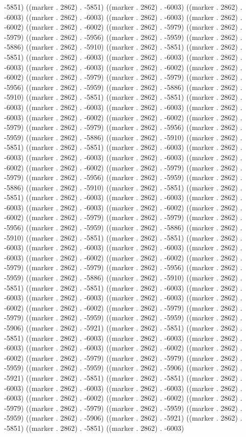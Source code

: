 -5851) ((marker . 2862) . -5851) ((marker . 2862) . -6003) ((marker . 2862) . -6003) ((marker . 2862) . -6003) ((marker . 2862) . -6003) ((marker . 2862) . -6002) ((marker . 2862) . -6002) ((marker . 2862) . -5979) ((marker . 2862) . -5979) ((marker . 2862) . -5956) ((marker . 2862) . -5959) ((marker . 2862) . -5886) ((marker . 2862) . -5910) ((marker . 2862) . -5851) ((marker . 2862) . -5851) ((marker . 2862) . -6003) ((marker . 2862) . -6003) ((marker . 2862) . -6003) ((marker . 2862) . -6003) ((marker . 2862) . -6002) ((marker . 2862) . -6002) ((marker . 2862) . -5979) ((marker . 2862) . -5979) ((marker . 2862) . -5956) ((marker . 2862) . -5959) ((marker . 2862) . -5886) ((marker . 2862) . -5910) ((marker . 2862) . -5851) ((marker . 2862) . -5851) ((marker . 2862) . -6003) ((marker . 2862) . -6003) ((marker . 2862) . -6003) ((marker . 2862) . -6003) ((marker . 2862) . -6002) ((marker . 2862) . -6002) ((marker . 2862) . -5979) ((marker . 2862) . -5979) ((marker . 2862) . -5956) ((marker . 2862) . -5959) ((marker . 2862) . -5886) ((marker . 2862) . -5910) ((marker . 2862) . -5851) ((marker . 2862) . -5851) ((marker . 2862) . -6003) ((marker . 2862) . -6003) ((marker . 2862) . -6003) ((marker . 2862) . -6003) ((marker . 2862) . -6002) ((marker . 2862) . -6002) ((marker . 2862) . -5979) ((marker . 2862) . -5979) ((marker . 2862) . -5956) ((marker . 2862) . -5959) ((marker . 2862) . -5886) ((marker . 2862) . -5910) ((marker . 2862) . -5851) ((marker . 2862) . -5851) ((marker . 2862) . -6003) ((marker . 2862) . -6003) ((marker . 2862) . -6003) ((marker . 2862) . -6003) ((marker . 2862) . -6002) ((marker . 2862) . -6002) ((marker . 2862) . -5979) ((marker . 2862) . -5979) ((marker . 2862) . -5956) ((marker . 2862) . -5959) ((marker . 2862) . -5886) ((marker . 2862) . -5910) ((marker . 2862) . -5851) ((marker . 2862) . -5851) ((marker . 2862) . -6003) ((marker . 2862) . -6003) ((marker . 2862) . -6003) ((marker . 2862) . -6003) ((marker . 2862) . -6002) ((marker . 2862) . -6002) ((marker . 2862) . -5979) ((marker . 2862) . -5979) ((marker . 2862) . -5956) ((marker . 2862) . -5959) ((marker . 2862) . -5886) ((marker . 2862) . -5910) ((marker . 2862) . -5851) ((marker . 2862) . -5851) ((marker . 2862) . -6003) ((marker . 2862) . -6003) ((marker . 2862) . -6003) ((marker . 2862) . -6003) ((marker . 2862) . -6002) ((marker . 2862) . -6002) ((marker . 2862) . -5979) ((marker . 2862) . -5979) ((marker . 2862) . -5959) ((marker . 2862) . -5959) ((marker . 2862) . -5906) ((marker . 2862) . -5921) ((marker . 2862) . -5851) ((marker . 2862) . -5851) ((marker . 2862) . -6003) ((marker . 2862) . -6003) ((marker . 2862) . -6003) ((marker . 2862) . -6003) ((marker . 2862) . -6002) ((marker . 2862) . -6002) ((marker . 2862) . -5979) ((marker . 2862) . -5979) ((marker . 2862) . -5959) ((marker . 2862) . -5959) ((marker . 2862) . -5906) ((marker . 2862) . -5921) ((marker . 2862) . -5851) ((marker . 2862) . -5851) ((marker . 2862) . -6003) ((marker . 2862) . -6003) ((marker . 2862) . -6003) ((marker . 2862) . -6003) ((marker . 2862) . -6002) ((marker . 2862) . -6002) ((marker . 2862) . -5979) ((marker . 2862) . -5979) ((marker . 2862) . -5959) ((marker . 2862) . -5959) ((marker . 2862) . -5906) ((marker . 2862) . -5921) ((marker . 2862) . -5851) ((marker . 2862) . -5851) ((marker . 2862) . -6003) 